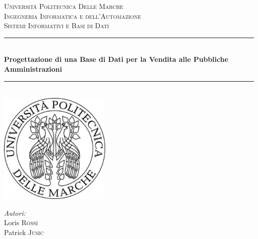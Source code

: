 
\begin{titlepage}

\newcommand{\HRule}{\rule{\linewidth}{0.5mm}} %

\center %

\textsc{\LARGE Universit\'{a} Politecnica Delle Marche}\\[1.5cm] %
\textsc{\Large Ingegneria Informatica e dell'Automazione}\\[0.5cm] %
\textsc{\large Sistemi Informativi e Basi di Dati}\\[0.5cm] %

\HRule \\[0.4cm]
{ \huge \bfseries Progettazione di una Base di Dati per la Vendita alle Pubbliche Amministrazioni}\\[0.4cm] %
\HRule \\[1.5cm]

\includegraphics[width=54mm, height=54mm]{./immagini/logo}\\[1cm] %

\vspace{1cm}
\begin{minipage}{\textwidth}
\begin{flushleft} \large
\emph{Autori:}\\
Loris \textsc{Rossi}\\ %
Patrick \textsc{Jusic}\\ %
\end{flushleft}
\end{minipage}



\vfill %

\end{titlepage}
